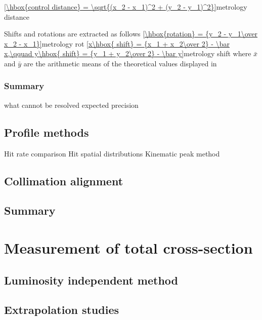 \eqref{\hbox{control distance} = \sqrt{(x_2 - x_1)^2 + (y_2 - y_1)^2}}{metrology distance}


Shifts and rotations are extracted as follows
\eqref{\hbox{rotation} = {y_2 - y_1\over x_2 - x_1}}{metrology rot}
\eqref{x\hbox{ shift} = {x_1 + x_2\over 2} - \bar x,\qquad y\hbox{ shift} = {y_1 + y_2\over 2} - \bar y}{metrology shift}
where $\bar x$ and $\bar y$ are the arithmetic means of the theoretical values displayed in 

\subsection{Summary}

\> what cannot be resolved
\> expected precision

\section{Profile methods}

\> Hit rate comparison
\> Hit spatial distributions
\> Kinematic peak method

\section{Collimation alignment}

\section{Summary}


\chapter{Measurement of total cross-section}

\section{Luminosity independent method}

\section{Extrapolation studies}

